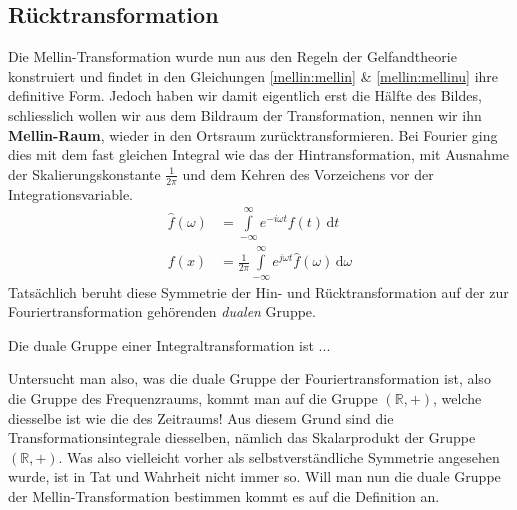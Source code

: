 \subsection{Rücktransformation
\label{mellin:subsection:ruecktransformation}}
Die Mellin-Transformation wurde nun aus den Regeln der Gelfandtheorie konstruiert und findet in den Gleichungen 
\eqref{mellin:mellin} \& \eqref{mellin:mellinu} ihre definitive Form.
Jedoch haben wir damit eigentlich erst die Hälfte des Bildes, schliesslich wollen wir aus dem Bildraum der Transformation, 
nennen wir ihn \textbf{Mellin-Raum}, wieder in den Ortsraum zurücktransformieren. 
Bei Fourier ging dies mit dem fast gleichen Integral wie das der Hintransformation, mit Ausnahme der Skalierungskonstante $\frac{1}{2\pi}$
und dem Kehren des Vorzeichens vor der Integrationsvariable.
\[
\begin{aligned}
    \hat{f}(\omega) &= \int\limits_{-\infty}^{\infty} e^{-i\omega{}t} f(t) \,\mathrm{d}t \\
    f(x) &= \frac{1}{2\pi} \int\limits_{-\infty}^{\infty} e^{j\omega t} \hat{f}(\omega) \,\mathrm{d}\omega
\end{aligned}
\]
Tatsächlich beruht diese Symmetrie der Hin- und Rücktransformation auf der zur Fouriertransformation gehörenden \emph{dualen} Gruppe.
\begin{definition}
    Die duale Gruppe einer Integraltransformation ist ...
\end{definition}
Untersucht man also, was die duale Gruppe der Fouriertransformation ist, also die Gruppe des Frequenzraums, kommt man auf die 
Gruppe $(\mathbb{R},+)$, welche diesselbe ist wie die des Zeitraums!
Aus diesem Grund sind die Transformationsintegrale diesselben, nämlich das Skalarprodukt der Gruppe $(\mathbb{R},+)$.
Was also vielleicht vorher als selbstverständliche Symmetrie angesehen wurde, ist in Tat und Wahrheit nicht immer so.
Will man nun die duale Gruppe der Mellin-Transformation bestimmen kommt es auf die Definition an. 


